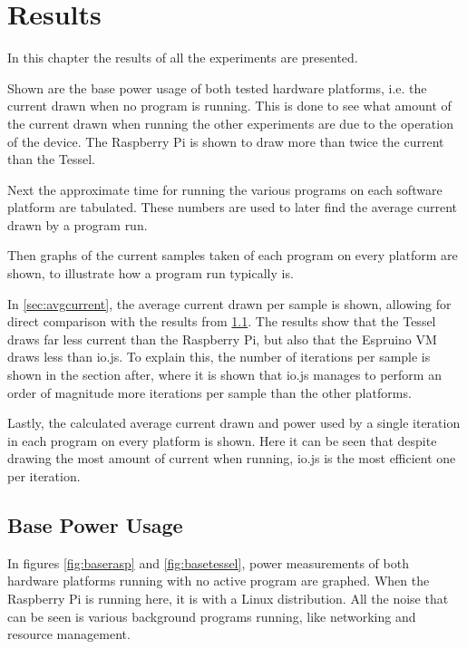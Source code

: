 \chapter{Results}
\label{chap:chapter4}

In this chapter the results of all the experiments are presented.

Shown are the base power usage of both tested hardware platforms, i.e. the current drawn when no program is running.
This is done to see what amount of the current drawn when running the other experiments are due to the operation of the device.
The Raspberry Pi is shown to draw more than twice the current than the Tessel.

Next the approximate time for running the various programs on each software platform are tabulated.
These numbers are used to later find the average current drawn by a program run.

Then graphs of the current samples taken of each program on every platform are shown, to illustrate how a program run typically is.

In \cref{sec:avgcurrent}, the average current drawn per sample is shown, allowing for direct comparison with the results from \cref{sec:basepower}.
The results show that the Tessel draws far less current than the Raspberry Pi, but also that the Espruino VM draws less than io.js.
To explain this, the number of iterations per sample is shown in the section after, where it is shown that io.js manages to perform an order of magnitude more iterations per sample than the other platforms.

Lastly, the calculated average current drawn and power used by a single iteration in each program on every platform is shown.
Here it can be seen that despite drawing the most amount of current when running, io.js is the most efficient one per iteration.

\section{Base Power Usage}
\label{sec:basepower}
In figures \ref{fig:baserasp} and \ref{fig:basetessel}, power measurements of both hardware platforms running with no active program are graphed.
When the Raspberry Pi is running here, it is with a Linux distribution.
All the noise that can be seen is various background programs running, like networking and resource management.

